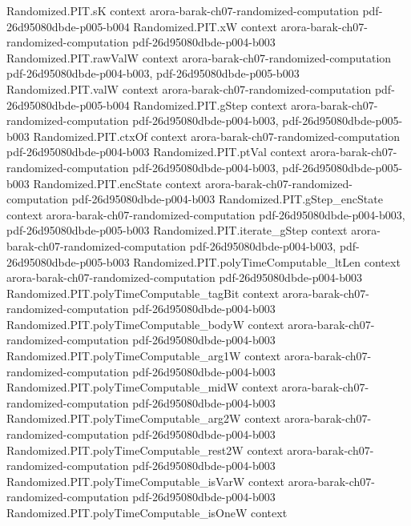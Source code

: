 \begin{theorem}
  {Randomized.PIT.sK}
  {context}
  {arora-barak-ch07-randomized-computation}
  {pdf-26d95080dbde-p005-b004}
\proofstep
  {Randomized.PIT.xW}
  {context}
  {arora-barak-ch07-randomized-computation}
  {pdf-26d95080dbde-p004-b003}
\proofstep
  {Randomized.PIT.rawValW}
  {context}
  {arora-barak-ch07-randomized-computation}
  {pdf-26d95080dbde-p004-b003,
    pdf-26d95080dbde-p005-b003}
\proofstep
  {Randomized.PIT.valW}
  {context}
  {arora-barak-ch07-randomized-computation}
  {pdf-26d95080dbde-p005-b004}
\proofstep
  {Randomized.PIT.gStep}
  {context}
  {arora-barak-ch07-randomized-computation}
  {pdf-26d95080dbde-p004-b003,
    pdf-26d95080dbde-p005-b003}
\proofstep
  {Randomized.PIT.ctxOf}
  {context}
  {arora-barak-ch07-randomized-computation}
  {pdf-26d95080dbde-p004-b003}
\proofstep
  {Randomized.PIT.ptVal}
  {context}
  {arora-barak-ch07-randomized-computation}
  {pdf-26d95080dbde-p004-b003,
    pdf-26d95080dbde-p005-b003}
\proofstep
  {Randomized.PIT.encState}
  {context}
  {arora-barak-ch07-randomized-computation}
  {pdf-26d95080dbde-p004-b003}
\proofstep
  {Randomized.PIT.gStep_encState}
  {context}
  {arora-barak-ch07-randomized-computation}
  {pdf-26d95080dbde-p004-b003,
    pdf-26d95080dbde-p005-b003}
\proofstep
  {Randomized.PIT.iterate_gStep}
  {context}
  {arora-barak-ch07-randomized-computation}
  {pdf-26d95080dbde-p004-b003,
    pdf-26d95080dbde-p005-b003}
\proofstep
  {Randomized.PIT.polyTimeComputable_ltLen}
  {context}
  {arora-barak-ch07-randomized-computation}
  {pdf-26d95080dbde-p004-b003}
\proofstep
  {Randomized.PIT.polyTimeComputable_tagBit}
  {context}
  {arora-barak-ch07-randomized-computation}
  {pdf-26d95080dbde-p004-b003}
\proofstep
  {Randomized.PIT.polyTimeComputable_bodyW}
  {context}
  {arora-barak-ch07-randomized-computation}
  {pdf-26d95080dbde-p004-b003}
\proofstep
  {Randomized.PIT.polyTimeComputable_arg1W}
  {context}
  {arora-barak-ch07-randomized-computation}
  {pdf-26d95080dbde-p004-b003}
\proofstep
  {Randomized.PIT.polyTimeComputable_midW}
  {context}
  {arora-barak-ch07-randomized-computation}
  {pdf-26d95080dbde-p004-b003}
\proofstep
  {Randomized.PIT.polyTimeComputable_arg2W}
  {context}
  {arora-barak-ch07-randomized-computation}
  {pdf-26d95080dbde-p004-b003}
\proofstep
  {Randomized.PIT.polyTimeComputable_rest2W}
  {context}
  {arora-barak-ch07-randomized-computation}
  {pdf-26d95080dbde-p004-b003}
\proofstep
  {Randomized.PIT.polyTimeComputable_isVarW}
  {context}
  {arora-barak-ch07-randomized-computation}
  {pdf-26d95080dbde-p004-b003}
\proofstep
  {Randomized.PIT.polyTimeComputable_isOneW}
  {context}

\end{theorem}
